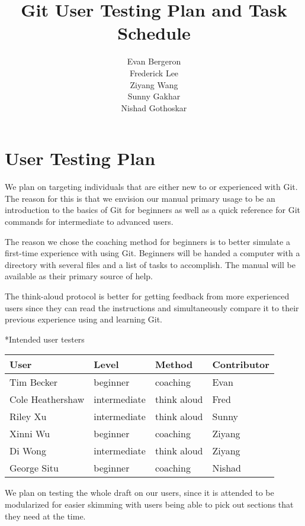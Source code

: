 \documentclass{amsart}
\title{Git User Testing Plan and Task Schedule}
\author{Evan Bergeron\\
Frederick Lee\\
Ziyang Wang\\
Sunny Gakhar\\
Nishad Gothoskar}
\makeatletter
\renewcommand\subsection{\@startsection{subsection}{2}%
  \z@{-.5\linespacing\@plus-.7\linespacing}{.5\linespacing}%
  {\normalfont\scshape}}
\makeatother
\begin{document}
\maketitle

\section*{User Testing Plan}

We plan on targeting individuals that are either new to or experienced with Git.  The reason for this is that we envision our manual primary usage to be an introduction to the basics of Git for beginners as well as a quick reference for Git commands for intermediate to advanced users.

The reason we chose the coaching method for beginners is to better simulate a first-time experience with using Git.  Beginners will be handed a computer with a directory with several files and a list of tasks to accomplish.  The manual will be available as their primary source of help.

The think-aloud protocol is better for getting feedback from more experienced users since they can read the instructions and simultaneously compare it to their previous experience using and learning Git.

\subsection*{Intended user testers}

\begin{center}
\begin{tabular}{llll}
User & Level & Method & Contributor\\
\hline
Tim Becker & beginner & coaching & Evan\\
Cole Heathershaw & intermediate & think aloud & Fred\\
Riley Xu & intermediate & think aloud & Sunny\\
Xinni Wu & beginner & coaching & Ziyang\\
Di Wong & intermediate & think aloud & Ziyang\\
George Situ & beginner & coaching & Nishad\\
\end{tabular}
\end{center}



We plan on testing the whole draft on our users, since it is attended to be modularized for easier skimming with users being able to pick out sections that they need at the time.
\end{document}
